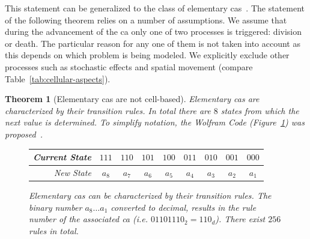 \documentclass{article}
\newtheorem{theorem}[definition]{Theorem}
\begin{document}
This statement can be generalized to the class of elementary \acp{ca}~\cite{Wolfram1983}.
The statement of the following theorem relies on a number of assumptions.
We assume that during the advancement of the \ac{ca} only one of two processes is triggered:
division or death.
The particular reason for any one of them is not taken into account as this depends on which
problem is being modeled.
We explicitly exclude other processes such as stochastic effects and spatial movement
(compare Table~\ref{tab:cellular-aspects}).

\begin{theorem}[Elementary \aclp{ca} are not cell-based]
    Elementary \acp{ca} are characterized by their transition rules.
    In total there are $8$ states from which the next value is determined.
    To simplify notation, the Wolfram Code (Figure~\ref{fig:wolfram-code}) was
    proposed~\cite{Wolfram1994-yw}.
    \begin{figure}[h]
        \centering
        \begin{tabular}{ r c c c c c c c c }
            Current State & $111$ & $110$ & $101$ & $100$ & $011$ & $010$ & $001$ & $000$\\
            \midrule
            New State & $a_8$ & $a_7$ & $a_6$ & $a_5$ & $a_4$ & $a_3$ & $a_2$ & $a_1$\\
        \end{tabular}
        \caption{
            Elementary \acp{ca} can be characterized by their transition rules.
            The binary number $a_8\dots a_1$ converted to decimal, results in the rule number of
            the associated \ac{ca} (i.e. $01101110_2=110_d$).
            There exist $256$ rules in total.
        }
        \label{fig:wolfram-code}
    \end{figure}
\end{theorem}
\end{document}

